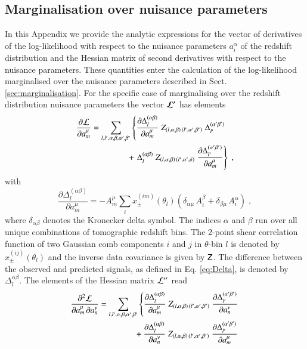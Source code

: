 \documentclass{aa}
\newcommand{\eq}[1]{\begin{equation}  #1 \end{equation}}
\newcommand{\eqa}[1]{\begin{align}   #1 \end{align}}
\newcommand{\br}[1]{\left( #1 \right)}
\newcommand{\nn}{\nonumber}
\begin{document}
\begin{appendix} 
\section{Marginalisation over nuisance parameters}
\label{ap:derivatives}
In this Appendix we provide the analytic expressions for the vector of derivatives of the log-likelihood with respect to the nuisance parameters $a_i^\alpha$ of the redshift distribution and the Hessian matrix of second derivatives with respect to the nuisance parameters. These quantities enter the calculation of the log-likelihood marginalised over the nuisance parameters described in Sect. \ref{sec:marginalisation}.
For the specific case of marginalising over the redshift distribution nuisance parameters the vector $\boldsymbol{\cal L^\prime}$ has elements
\eqa{
\frac{\partial {\cal L}}{\partial a_m^\mu} &= \sum_{l,l',\alpha,\beta,\alpha',\beta'}  \left\{ \frac{\partial \Delta_l^{(\alpha \beta)}}{\partial a_m^\mu}\; Z_{(l,\alpha,\beta) \,  (l',\alpha',\beta')}\; \Delta_{l'}^{(\alpha' \beta')} \right. \\ \nn
& \hspace*{1.5cm} + \left. \Delta_l^{(\alpha \beta)}\; Z_{(l,\alpha,\beta) \,  (l',\alpha',\delta)}\; \frac{\partial \Delta_{l'}^{(\alpha' \beta')}}{\partial a_m^\mu} \right\}\;,
}
with
\eq{
\frac{\partial \Delta_l^{(\alpha \beta)}}{\partial a_m^\mu} = - A_m^\mu \sum_i x_\pm^{(im)}(\theta_l) \br{\delta_{\alpha \mu}\, A_i^\beta + \delta_{\beta \mu}\, A_i^\alpha}\;,
}
where $\delta_{\alpha \beta}$ denotes the Kronecker delta symbol. The indices $\alpha$ and $\beta$ run over all unique combinations of tomographic redshift bins. The 2-point shear correlation function of two Gaussian comb components $i$ and $j$ in $\theta$-bin $l$ is denoted by $x_\pm^{(ij)}(\theta_l)$ and the inverse data covariance is given by $\mathsf{Z}$. The difference between the observed and predicted signals, as defined in Eq. \eqref{eq:Delta}, is denoted by $\Delta_l^{\alpha\beta}$.
The elements of the Hessian matrix ${\cal L^{\prime\prime}}$ read
\eqa{
\label{eq:hessian}
\frac{\partial^2 {\cal L}}{\partial a_m^\mu\, \partial a_n^\nu} &= \sum_{l,l',\alpha,\beta,\alpha',\beta'} 
\left\{ 
\frac{\partial \Delta_l^{(\alpha \beta)}}{\partial a_m^\mu}\; Z_{(l,\alpha,\beta) \,  (l',\alpha',\beta')}\; \frac{\partial \Delta_{l'}^{(\alpha' \beta')}}{\partial a_n^\nu}  \right. \\ \nn
&\hspace*{1.5cm}+ \frac{\partial \Delta_l^{(\alpha \beta)}}{\partial a_n^\nu}\; Z_{(l,\alpha,\beta) \,  (l',\alpha',\beta')}\; \frac{\partial \Delta_{l'}^{(\alpha' \beta')}}{\partial a_m^\mu} \\ \nn
}
\end{appendix}
\end{document}
